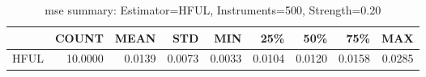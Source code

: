 \begin{table}[ht]
\centering
\caption{mse summary: Estimator=HFUL, Instruments=500, Strength=0.20}
\begin{tabular}{lrrrrrrrr}
\toprule
 & COUNT & MEAN & STD & MIN & 25\% & 50\% & 75\% & MAX \\
\midrule
HFUL & 10.0000 & 0.0139 & 0.0073 & 0.0033 & 0.0104 & 0.0120 & 0.0158 & 0.0285 \\
\bottomrule
\end{tabular}
\end{table}
